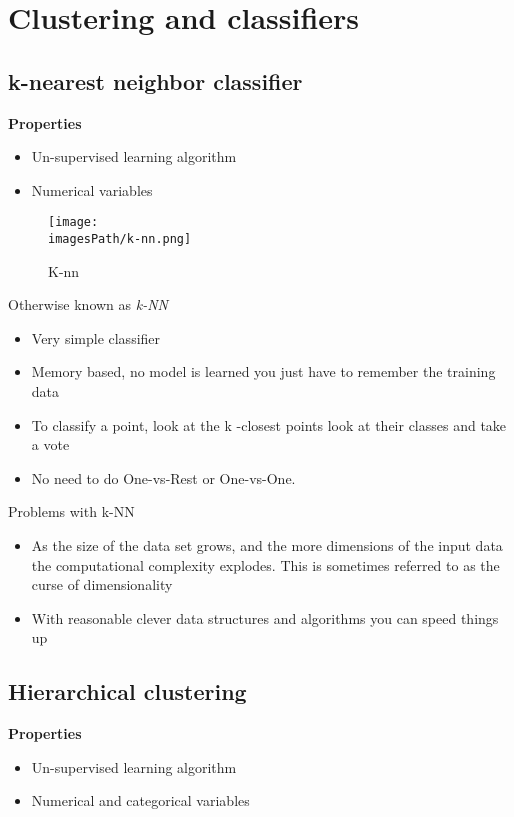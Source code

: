 \section{Clustering and classifiers}
\subsection{k-nearest neighbor classifier}
\textbf{Properties}
\begin{itemize}
    \item Un-supervised learning algorithm
    \item Numerical variables 
\end{itemize}
\begin{figure}[!h]
    \centering
    \texttt{[image: \\imagesPath/k-nn.png]}
    \caption{K-nn}
\end{figure}


Otherwise known as \textit{k-NN}
\begin{itemize}
    \item Very simple classifier
    \item Memory based, no model is learned you just have to remember the
training data
    \item To classify a point, look at the k -closest points look at their classes
and take a vote
    \item No need to do One-vs-Rest or One-vs-One.
\end{itemize}

Problems with k-NN
\begin{itemize}
    \item As the size of the data set grows, and the more dimensions of the
    input data the computational complexity explodes. This is sometimes
    referred to as the curse of dimensionality
    \item With reasonable clever data structures and algorithms you can speed
things up
\end{itemize}


\subsection{Hierarchical clustering}
\textbf{Properties}
\begin{itemize}
    \item Un-supervised learning algorithm
    \item Numerical and categorical variables 
\end{itemize}

